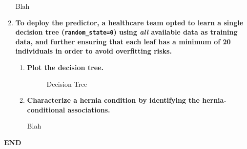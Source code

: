 \documentclass[12pt]{article}
\begin{document}
\begin{enumerate}[leftmargin=\labelsep]
          \vskip 0.3cm
          Blah

    \item \textbf{To deploy the predictor, a healthcare team opted to learn a single decision tree
          (\texttt{random\_state=0}) using \textit{all} available data as training data, and further ensuring that each leaf has
          a minimum of 20 individuals in order to avoid overfitting risks.}
          \begin{enumerate}
          \item \textbf{Plot the decision tree.}

          \vskip 0.3cm
          

          \vskip -0.7cm
          \begin{figure}[H]
              \centering
              
              \caption{Decision Tree}
              \label{fig:PartII-ex4a-plot}
          \end{figure}

          \item \textbf{Characterize a hernia condition by identifying the hernia-conditional associations.}

          \vskip 0.3cm
          Blah
          \end{enumerate}
\end{enumerate}

\vskip 1cm
\center\textbf{END}
\end{document}
